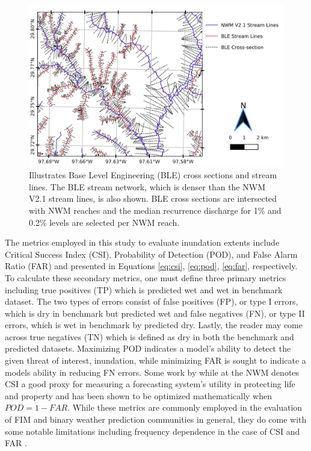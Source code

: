%
\begin{figure}[h!]
\centering
\includegraphics[scale=1.0]{figures/ble_evaluation_method.jpg}
\caption{Illustrates Base Level Engineering (BLE) cross sections and stream lines. The BLE stream network, which is denser than the NWM V2.1 stream lines, is also shown. BLE cross sections are intersected with NWM reaches and the median recurrence discharge for 1\% and 0.2\% levels are selected per NWM reach. }
\label{fig:ble_evaluation_method}
\end{figure}
%
The metrics employed in this study to evaluate inundation extents include Critical Success Index (CSI), Probability of Detection (POD), and False Alarm Ratio (FAR) and presented in Equations \ref{eq:csi}, \ref{eq:pod}, \ref{eq:far}, respectively.
To calculate these secondary metrics, one must define three primary metrics including true positives (TP) which is predicted wet and wet in benchmark dataset.
The two types of errors consist of false positives (FP), or type I errors, which is dry in benchmark but predicted wet and false negatives (FN), or type II errors, which is wet in benchmark by predicted dry. 
Lastly, the reader may come across true negatives (TN) which is defined as dry in both the benchmark and predicted datasets.
Maximizing POD indicates a model's ability to detect the given threat of interest, inundation, while minimizing FAR is sought to indicate a models ability in reducing FN errors.
Some work by  while at the NWM denotes CSI a good proxy for measuring a forecasting system's utility in protecting life and property and has been shown to be optimized mathematically when $POD = 1 - FAR$.
While these metrics are commonly employed in the evaluation of FIM and binary weather prediction communities in general, they do come with some notable limitations including frequency dependence in the case of CSI and FAR \cite{gerapetritis2004behavior,stephens2014problems,schaefer1990critical,jolliffe2012forecast}.
